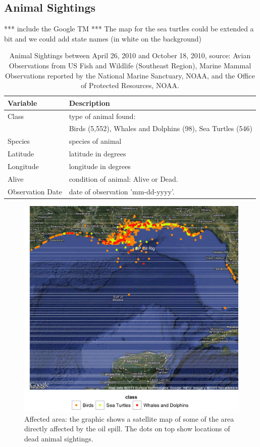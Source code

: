 \documentclass[authoryear,12pt]{elsarticle}
\begin{document}
\subsection{Animal Sightings}
***  include the Google TM
*** The map for the sea turtles could be extended a bit and we could add state names (in white on the background)

\begin{table}
\begin{tabular}{lp{11cm}}
\bf Variable & \bf Description \\\hline
Class & type of animal found: \\
& {\small Birds (5,552),   Whales and Dolphins  (98),  Sea Turtles (546)}\\
Species & species of animal \\
Latitude & latitude in degrees  \\
Longitude & longitude in degrees\\
Alive & condition of animal: Alive or Dead. \\
Observation Date & date of observation 'mm-dd-yyyy'. \\
\end{tabular}
\label{table.animal}
\caption{Animal Sightings between April 26, 2010 and October 18, 2010, source: Avian Observations from US Fish and Wildlife (Southeast Region),  Marine Mammal Observations reported by  the National Marine Sanctuary, NOAA, and the Office of Protected Resources, NOAA.}
\end{table}
\begin{figure}[htbp] %
   \centering
   \includegraphics[width=4.5in]{animal_deaths.png} 
   \caption{Affected area: the graphic shows a satellite map of some of the area directly affected by the oil spill. The dots on top show locations of dead animal sightings. }
   \label{deaths}
\end{figure}
\end{document}
